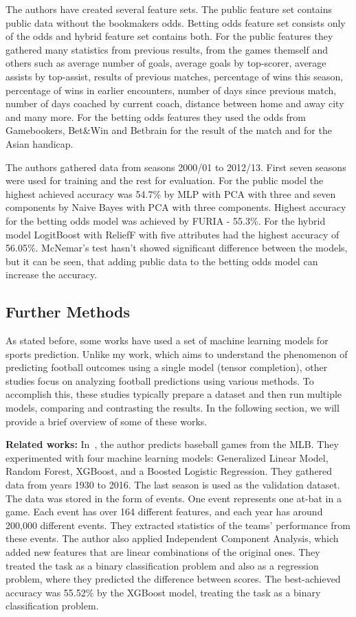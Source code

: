 \documentclass[thesis=M,english]{FITthesis}[2019/12/23]
\begin{document}
 The authors have created several feature sets. The public feature set contains public data without the bookmakers odds. Betting odds feature set consists only of the odds and hybrid feature set contains both. For the public features they gathered many statistics from previous results, from the games themself and others such as average number of goals, average goals by top-scorer, average assists by top-assist, results of previous matches, percentage of wins this season, percentage of wins in earlier encounters, number of days since previous match, number of days coached by current coach, distance between home and away city and many more. For the betting odds features they used the odds from Gamebookers, Bet\&Win and Betbrain for the result of the match and for the Asian handicap.
 
 The authors gathered data from seasons 2000/01 to 2012/13. First seven seasons were used for training and the rest for evaluation. For the public model the highest achieved accuracy was 54.7\% by MLP with PCA with three and seven components by Naive Bayes with PCA with three components. Highest accuracy for the betting odds model was achieved by FURIA - 55.3\%. For the hybrid model LogitBoost with ReliefF with five attributes had the highest accuracy of 56.05\%. McNemar’s test hasn't showed significant difference between the models, but it can be seen, that adding public data to the betting odds model can increase the accuracy.

\subsection{Further Methods}
As stated before, some works have used a set of machine learning models for sports prediction. Unlike my work, which aims to understand the phenomenon of predicting football outcomes using a single model (tensor completion), other studies focus on analyzing football predictions using various methods. To accomplish this, these studies typically prepare a dataset and then run multiple models, comparing and contrasting the results. In the following section, we will provide a brief overview of some of these works.

\noindent \textbf{Related works:} In~\cite{MLB_regression}, the author predicts baseball games from the MLB. They experimented with four machine learning models: Generalized Linear Model, Random Forest, XGBoost, and a Boosted Logistic Regression. They gathered data from years 1930 to 2016. The last season is used as the validation dataset. The data was stored in the form of events. One event represents one at-bat in a game. Each event has over 164 different features, and each year has around 200,000 different events. They extracted statistics of the teams' performance from these events. The author also applied Independent Component Analysis, which added new features that are linear combinations of the original ones. They treated the task as a binary classification problem and also as a regression problem, where they predicted the difference between scores. The best-achieved accuracy was 55.52\% by the XGBoost model, treating the task as a binary classification problem.
\end{document}
